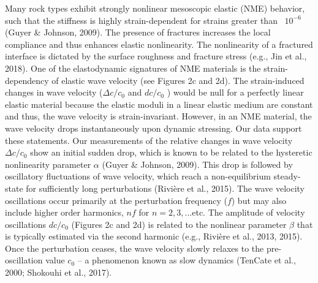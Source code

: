 Many rock types exhibit strongly nonlinear mesoscopic elastic (NME) behavior, such that the stiffness is highly strain-dependent for strains greater than ~$ 10^{-6} $ (Guyer \& Johnson, 2009). The presence of fractures increases the local compliance and thus enhances elastic nonlinearity. The nonlinearity of a fractured interface is dictated by the surface roughness and fracture stress (e.g., Jin et al., 2018). One of the elastodynamic signatures of NME materials is the strain-dependency of elastic wave velocity (see
 Figures 2c and 2d). The strain-induced changes in wave velocity ($ \Delta c/c_0 $ and $ dc/c_0 $ ) would be null for a perfectly linear elastic material because the elastic moduli in a linear elastic medium are constant and thus, the wave velocity is strain-invariant. However, in an NME material, the wave velocity drops instantaneously upon dynamic stressing. Our data support these statements. Our measurements of the relative changes in wave velocity $ \Delta c/c_0 $ show an initial sudden drop, which is known to be related to the hysteretic nonlinearity parameter $ \alpha $ (Guyer \& Johnson, 2009). This drop is followed by oscillatory fluctuations of wave velocity, which reach a non-equilibrium steady-state for sufficiently long perturbations (Rivière et al., 2015). The wave velocity oscillations occur primarily at the perturbation frequency ($ f $) but may also include higher order harmonics, $ nf $ for $ n = 2,3,... $etc. The amplitude of velocity oscillations $ dc/c_0 $ (Figures 2c and 2d) is related to the nonlinear parameter $ \beta $ that is typically estimated via the second harmonic (e.g., Rivière et al., 2013, 2015). Once the perturbation ceases, the wave velocity slowly relaxes to the pre-oscillation value $ c_0 $ -- a phenomenon known as slow dynamics (TenCate et al., 2000; Shokouhi et al., 2017).

%


